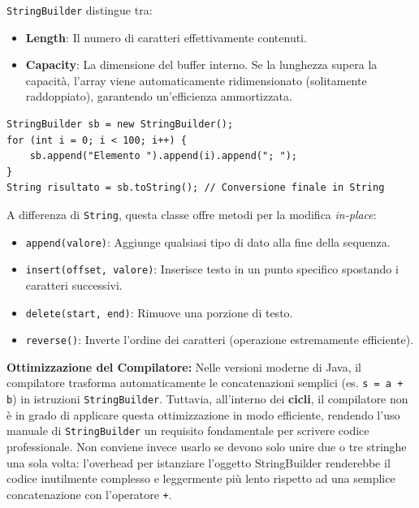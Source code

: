\begin{observation}
    \texttt{StringBuilder} distingue tra:
    \begin{itemize}
        \item \textbf{Length}: Il numero di caratteri effettivamente contenuti.
        \item \textbf{Capacity}: La dimensione del buffer interno. Se la lunghezza supera la capacità, l'array viene automaticamente ridimensionato (solitamente raddoppiato), garantendo un'efficienza ammortizzata.
    \end{itemize}
\end{observation}

\begin{lstlisting}[caption={Esempio di utilizzo efficiente in un ciclo}]
StringBuilder sb = new StringBuilder();
for (int i = 0; i < 100; i++) {
    sb.append("Elemento ").append(i).append("; ");
}
String risultato = sb.toString(); // Conversione finale in String
\end{lstlisting}

A differenza di \texttt{String}, questa classe offre metodi per la modifica \textit{in-place}:
\begin{itemize}
    \item \texttt{append(valore)}: Aggiunge qualsiasi tipo di dato alla fine della sequenza.
    \item \texttt{insert(offset, valore)}: Inserisce testo in un punto specifico spostando i caratteri successivi.
    \item \texttt{delete(start, end)}: Rimuove una porzione di testo.
    \item \texttt{reverse()}: Inverte l'ordine dei caratteri (operazione estremamente efficiente).
\end{itemize}

\begin{warningbox}[]
    \textbf{Ottimizzazione del Compilatore:} Nelle versioni moderne di Java, il compilatore trasforma automaticamente le concatenazioni semplici (es. \texttt{s = a + b}) in istruzioni \texttt{StringBuilder}. Tuttavia, all'interno dei \textbf{cicli}, il compilatore non è in grado di applicare questa ottimizzazione in modo efficiente, rendendo l'uso manuale di \texttt{StringBuilder} un requisito fondamentale per scrivere codice professionale. Non conviene invece usarlo se devono solo unire due o tre stringhe una sola volta: l'overhead per istanziare l'oggetto StringBuilder renderebbe il codice inutilmente complesso e leggermente più lento rispetto ad una semplice concatenazione con l'operatore \texttt{+}.
\end{warningbox}


